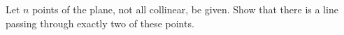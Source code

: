 Let $n$ points of the plane, not all collinear, be given. Show that there is a line passing through exactly two of these points.
